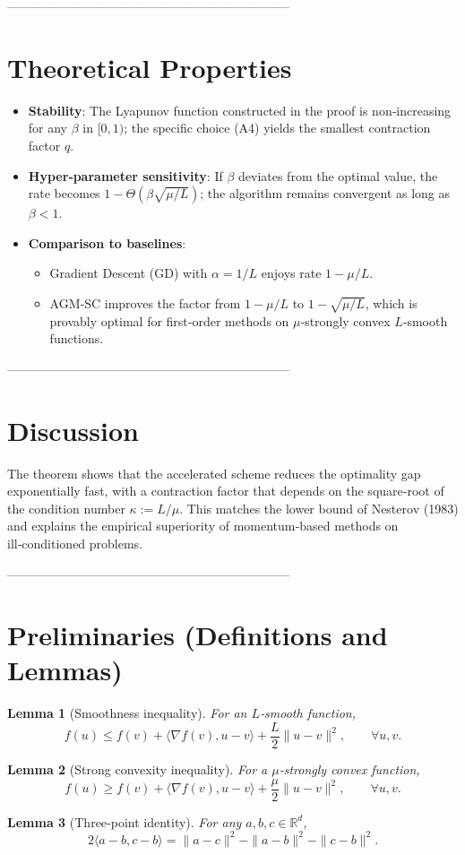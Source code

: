 \documentclass{article}
\newtheorem{lemma}{Lemma}
\begin{document}
--------------------------------------------------------------------
\section*{Theoretical Properties}
\begin{itemize}
\item \textbf{Stability}: The Lyapunov function constructed in the proof is non‑increasing for any $\beta$ in $[0,1)$; the specific choice (A4) yields the smallest contraction factor $q$.
\item \textbf{Hyper‑parameter sensitivity}: If $\beta$ deviates from the optimal value, the rate becomes $1-\Theta(\beta\sqrt{\mu/L})$; the algorithm remains convergent as long as $\beta<1$.
\item \textbf{Comparison to baselines}:
    \begin{itemize}
        \item Gradient Descent (GD) with $\alpha=1/L$ enjoys rate $1-\mu/L$.
        \item AGM‑SC improves the factor from $1-\mu/L$ to $1-\sqrt{\mu/L}$, which is provably optimal for first‑order methods on $\mu$‑strongly convex $L$‑smooth functions.
    \end{itemize}
\end{itemize}

--------------------------------------------------------------------
\section*{Discussion}
The theorem shows that the accelerated scheme reduces the optimality gap exponentially fast, with a contraction factor that depends on the square‑root of the condition number $\kappa:=L/\mu$. This matches the lower bound of Nesterov (1983) and explains the empirical superiority of momentum‑based methods on ill‑conditioned problems.

--------------------------------------------------------------------
\section*{Preliminaries (Definitions and Lemmas)}
\begin{lemma}[Smoothness inequality]\label{lem:smooth}
For an $L$‑smooth function,
\[
f(u)\le f(v)+\langle\nabla f(v),u-v\rangle+\frac{L}{2}\|u-v\|^{2},\qquad\forall u,v.
\tag{5}
\]
\end{lemma}
\begin{lemma}[Strong convexity inequality]\label{lem:strong}
For a $\mu$‑strongly convex function,
\[
f(u)\ge f(v)+\langle\nabla f(v),u-v\rangle+\frac{\mu}{2}\|u-v\|^{2},\qquad\forall u,v.
\tag{6}
\]
\end{lemma}
\begin{lemma}[Three‑point identity]\label{lem:three}
For any $a,b,c\in\mathbb{R}^{d}$,
\[
2\langle a-b,c-b\rangle=\|a-c\|^{2}-\|a-b\|^{2}-\|c-b\|^{2}.
\tag{7}
\]
\end{lemma}
\end{document}
